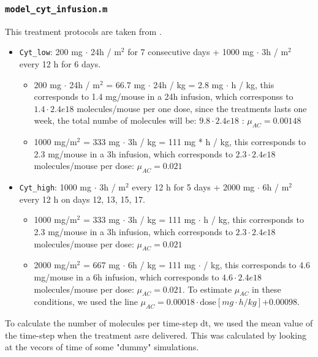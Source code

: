 \subsubsection{\texttt{model\_cyt\_infusion.m}}
This treatment protocols are taken from \cite{cyt-3}.
\begin{itemize}
	\item \texttt{Cyt\_low}: 200 mg $\cdot$ 24h / m$^2$ for 7 consecutive days + 1000 mg $\cdot$ 3h / m$^2$ every 12 h for 6 days.
	\begin{itemize}
		\item 200 mg $\cdot$ 24h / m$^2$ = 66.7 mg $\cdot$ 24h / kg = 2.8 mg $\cdot$ h / kg, this corresponds to 1.4 mg/mouse in a 24h infusion, which corresponss to $1.4 \cdot 2.4e18$ molecules/mouse per one dose, since the treatments lasts one week, the total numbe of molecules will be: $9.8 \cdot 2.4e18$ : $\mu_{AC} = 0.00148$
		\item 1000 mg/m$^2$ = 333 mg $\cdot$ 3h / kg = 111 mg * h / kg, this corresponds to 2.3 mg/mouse in a 3h infusion, which corresponds to $2.3 \cdot 2.4e18$ molecules/mouse per dose: $\mu_{AC} = 0.021$
	\end{itemize}

	\item \texttt{Cyt\_high}: 1000 mg $\cdot$ 3h / m$^2$ every 12 h for 5 days + 2000 mg $\cdot$ 6h / m$^2$ every 12 h on days 12, 13, 15, 17.
	\begin{itemize}
		\item 1000 mg/m$^2$ = 333 mg $\cdot$ 3h / kg = 111 mg $\cdot$ h / kg, this corresponds to 2.3 mg/mouse in a 3h infusion, which corresponds to $2.3 \cdot 2.4e18$ molecules/mouse per dose: $\mu_{AC} = 0.021$
		\item 2000 mg/m$^2$ = 667 mg $\cdot$ 6h / kg = 111 mg $\cdot$ / kg, this corresponds to 4.6 mg/mouse in a 6h infusion, which corresponds to $4.6 \cdot 2.4e18$ molecules/mouse per dose: $\mu_{AC} = 0.021$. To estimate $\mu_{AC}$ in these conditions, we used the line $\mu_{AC} = 0.00018 \cdot \text{dose} [mg \cdot h/kg]$$+ 0.00098$.
	\end{itemize}
\end{itemize}

To calculate the number of molecules per time-step dt, we used the mean value of the time-step when the treatment asre delivered. This was calculated by looking at the vecors of time of some "dummy" simulations.
